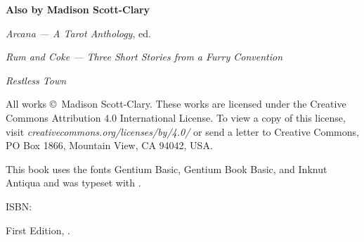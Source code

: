 
\thispagestyle{empty}
\null
\vfill
\begin{center}
    \noindent\textbf{\DisplayFont Also by Madison Scott-Clary}

    \emph{Arcana --- A Tarot Anthology}, ed.

    \emph{Rum and Coke --- Three Short Stories from a Furry Convention}

    \emph{Restless Town}
\end{center}
\vfill
\singlespacing
{\small\parindent0pt\parskip5pt
\noindent All works \copyright\ Madison Scott-Clary. These works are licensed under the Creative Commons Attribution 4.0 International License. To view a copy of this license, visit \mbox{\emph{creativecommons.org/licenses/by/4.0/}} or send a letter to Creative Commons, PO Box 1866, Mountain View, CA 94042, USA.

This book uses the fonts Gentium Basic, {\AltFont Gentium Book Basic}, and {\TitleFont Inknut Antiqua} and was typeset with {\XeLaTeX}.

\vspace{1ex}

ISBN: \ISBN

\vspace{1ex}

\emph{\Title}

\vspace{1ex}

First Edition, \Year.

\EditionsList
}

\cleardoublepage
